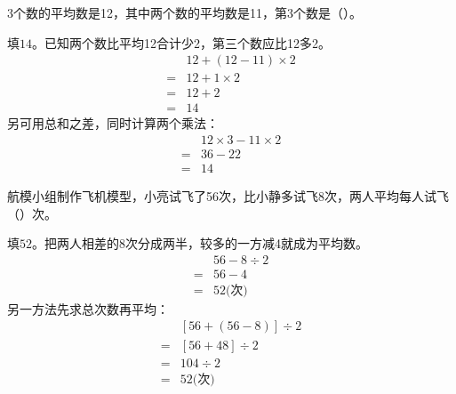 3个数的平均数是12，其中两个数的平均数是11，第3个数是（\hspace{1.8em}）。\par
\begin{BookAnswer}
填\(14\)。已知两个数比平均12合计少2，第三个数应比12多2。\[\begin{aligned}&12+(12-11)\times2\\={}&12+1\times2\\={}&12+2\\={}&14\end{aligned}\]另可用总和之差，同时计算两个乘法：\[\begin{aligned}&12\times3-11\times2\\={}&36-22\\={}&14\end{aligned}\]
\end{BookAnswer}

航模小组制作飞机模型，小亮试飞了56次，比小静多试飞8次，两人平均每人试飞（\hspace{1.8em}）次。\par
\begin{BookAnswer}
填\(52\)。把两人相差的8次分成两半，较多的一方减4就成为平均数。\[\begin{aligned}&56-8\div2\\={}&56-4\\={}&52\text{(次)}\end{aligned}\]另一方法先求总次数再平均：\[\begin{aligned}&[56+(56-8)]\div2\\={}&[56+48]\div2\\={}&104\div2\\={}&52\text{(次)}\end{aligned}\]
\end{BookAnswer}

